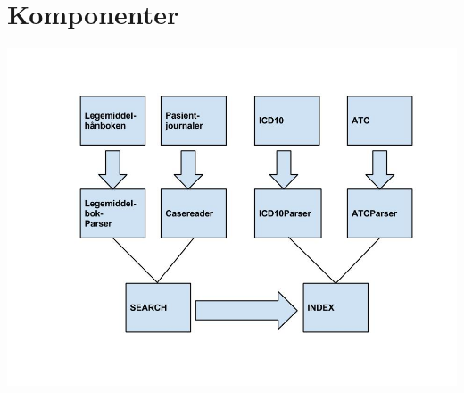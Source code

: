 \section{Komponenter}
\label{komponenter}

\begin{center}
\includegraphics{section/Components}
\end{center}
